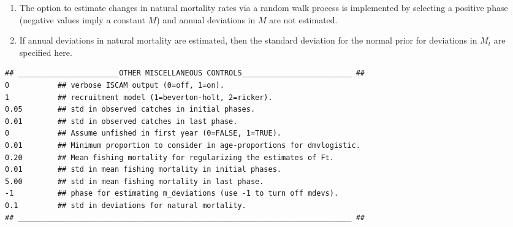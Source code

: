 \begin{multicols}{2}
\begin{enumerate}
	\item The option to estimate changes in natural mortality rates via a random walk process is implemented by selecting a positive phase (negative values imply a constant $M$) and annual deviations in $M$ are not estimated.
	
	\item  If annual deviations in natural mortality are estimated, then the standard deviation for the normal prior for deviations in $M_t$ are specified here.
\end{enumerate}




\begin{tiny}
\begin{verbatim}
## _______________________OTHER MISCELLANEOUS CONTROLS_________________________ ##
0           ## verbose ISCAM output (0=off, 1=on).
1           ## recruitment model (1=beverton-holt, 2=ricker).
0.05        ## std in observed catches in initial phases.
0.01        ## std in observed catches in last phase.
0           ## Assume unfished in first year (0=FALSE, 1=TRUE).
0.01        ## Minimum proportion to consider in age-proportions for dmvlogistic.
0.20        ## Mean fishing mortality for regularizing the estimates of Ft.
0.01        ## std in mean fishing mortality in initial phases.
5.00        ## std in mean fishing mortality in last phase.
-1          ## phase for estimating m_deviations (use -1 to turn off mdevs).
0.1         ## std in deviations for natural mortality.
## ____________________________________________________________________________ ##

\end{verbatim}
\end{tiny}


\end{multicols}





